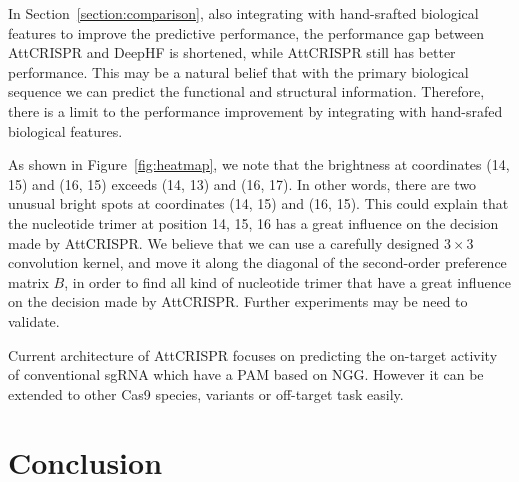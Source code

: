 \documentclass{bioinfo}
\begin{document}
In Section~\ref{section:comparison}, also integrating with hand-srafted biological features to improve the predictive performance, the performance gap between AttCRISPR and DeepHF is shortened, while AttCRISPR still has better performance. 
This may be a natural belief that with the primary biological sequence we can predict the functional and structural information. 
Therefore, there is a limit to the performance improvement by integrating with hand-srafed biological features. 

As shown in Figure~\ref{fig:heatmap}, we note that the brightness at coordinates (14, 15) and (16, 15) exceeds (14, 13) and (16, 17). 
In other words, there are two unusual bright spots at coordinates (14, 15) and (16, 15). 
This could explain that the nucleotide trimer at position 14, 15, 16 has a great influence on the decision made by AttCRISPR. 
We believe that we can use a carefully designed $3\times 3$ convolution kernel, and move it along the diagonal of the second-order preference matrix $B$, 
in order to find all kind of nucleotide trimer that have a great influence on the decision made by AttCRISPR. 
Further experiments may be need to validate. 

Current architecture of AttCRISPR focuses on predicting the on-target activity of conventional sgRNA which have a PAM based on NGG. 
However it can be extended to other Cas9 species, variants or off-target task easily. 

\section{Conclusion}
\end{document}
